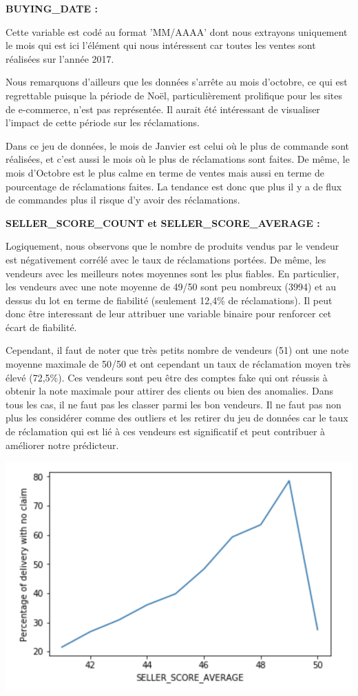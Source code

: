 \textbf{BUYING_DATE :}

Cette variable est codé au format 'MM/AAAA' dont nous extrayons uniquement le mois qui est ici 
l'élément qui nous intéressent car toutes les ventes sont réalisées sur l'année 2017.

Nous remarquons d'ailleurs que les données s'arrête au mois d'octobre, ce qui est regrettable
puisque la période de Noël, particulièrement prolifique pour les sites de e-commerce, n'est 
pas représentée. Il aurait été intéressant de visualiser l'impact de cette période sur les
réclamations.

Dans ce jeu de données, le mois de Janvier est celui où le plus de commande sont réalisées,
et c'est aussi le mois où le plus de réclamations sont faites. De même, le mois d'Octobre
est le plus calme en terme de ventes mais aussi en terme de pourcentage de réclamations
faites. La tendance est donc que plus il y a de flux de commandes plus il risque d'y avoir
des réclamations.

\textbf{SELLER_SCORE_COUNT et SELLER_SCORE_AVERAGE :}

Logiquement, nous observons que le nombre de produits vendus par le vendeur est négativement
corrélé avec le taux de réclamations portées. De même, les vendeurs avec les meilleurs
notes moyennes sont les plus fiables. En particulier, les vendeurs avec une note moyenne de
49/50 sont peu nombreux (3994) et au dessus du lot en terme de fiabilité (seulement 12,4\%
de réclamations). Il peut donc être interessant de leur attribuer une variable binaire pour 
renforcer cet écart de fiabilité.

Cependant, il faut de noter que très petits nombre de vendeurs (51) ont une note moyenne 
maximale de 50/50 et ont cependant un taux de réclamation moyen très élevé (72,5\%).
Ces vendeurs sont peu être des comptes fake qui ont réussis à obtenir la note maximale
pour attirer des clients ou bien des anomalies. Dans tous les cas, il ne faut pas les 
classer parmi les bon vendeurs. Il ne faut pas non plus les considérer comme des outliers
et les retirer du jeu de données car le taux de réclamation qui est lié à ces vendeurs est 
significatif et peut contribuer à améliorer notre prédicteur.

\begin{center}
\includegraphics[scale=0.5]{assets/sellerscore} 
\end{center}

